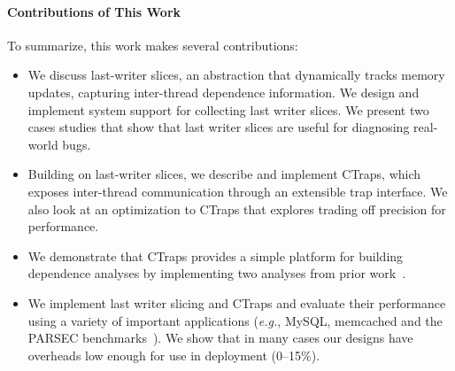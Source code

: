 \documentclass[preprint,9pt]{sigplanconf}
\newcommand{\ctraps}{CTraps\xspace}
\begin{document}
\paragraph{Contributions of This Work}
To summarize, this work makes several contributions:
\begin{itemize}

\item{We discuss last-writer slices, an abstraction that dynamically tracks
memory updates, capturing inter-thread dependence information.  We
design and implement system support for collecting last writer slices.  We
present two cases studies that show that last writer slices are useful for
diagnosing real-world bugs.}

\item{Building on last-writer slices, we describe and implement \ctraps, which
exposes inter-thread communication through an extensible trap interface.
We also look at an optimization to \ctraps that explores trading off
precision for performance.}

\item{We demonstrate that \ctraps provides a simple platform for building
dependence analyses by implementing two analyses from prior
work~\cite{cci,defuse,recon}. }

\item{We implement last writer slicing and \ctraps and evaluate their performance using a
variety of important applications ({\em e.g.}, MySQL, memcached and the PARSEC
benchmarks~\cite{parsec}).  We show that in many cases our designs have overheads
low enough for use in deployment (0--15\%).}

\end{itemize}




\end{document}
